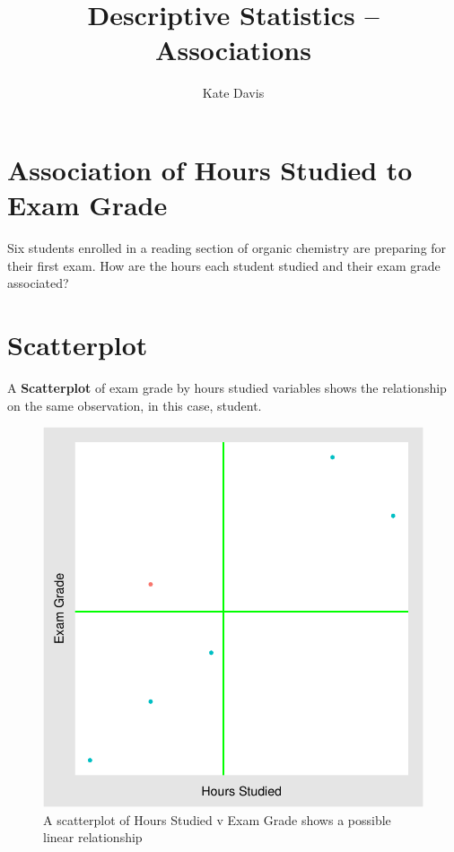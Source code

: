 \documentclass[nohyper,justified]{tufte-handout}\usepackage[]{graphicx}\usepackage[]{color}
\title{Descriptive Statistics -- Associations}
\author{Kate Davis}
\makeatletter
\def\maxwidth{ %
  \ifdim\Gin@nat@width>\linewidth
    \linewidth
  \else
    \Gin@nat@width
  \fi
}
\newenvironment{knitrout}{}{} %
\makeatother
\begin{document}



\section{Association of Hours Studied to Exam Grade}
Six students enrolled in a reading section of organic chemistry are preparing for their first exam. How are the hours each student studied and their exam grade associated?

\section{Scatterplot}
A \textbf{Scatterplot} of exam grade by hours studied variables shows the relationship on the same observation, in this case, student. 
\begin{knitrout}
\color{fgcolor}\begin{figure}

{\centering \includegraphics[width=\maxwidth]{figure/graphics-scatterplotsxy-1} 

}

\caption[A scatterplot of Hours Studied v Exam Grade shows a possible linear relationship]{A scatterplot of Hours Studied v Exam Grade shows a possible linear relationship}\label{fig:scatterplotsxy}
\end{figure}


\end{knitrout}
\end{document}
